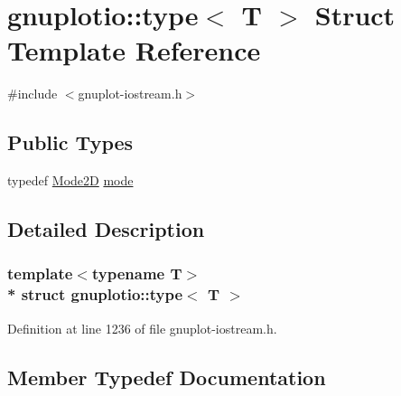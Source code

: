 \hypertarget{structgnuplotio_1_1_mode_auto_decoder_3_01_t_00_01typename_01boost_1_1enable__if__c_3_01_07_arra33ab7f3325313485a7f29355d9a819fc}{}\section{gnuplotio\+:\+:type$<$ T $>$ Struct Template Reference}
\label{structgnuplotio_1_1_mode_auto_decoder_3_01_t_00_01typename_01boost_1_1enable__if__c_3_01_07_arra33ab7f3325313485a7f29355d9a819fc}


{\ttfamily \#include $<$gnuplot-\/iostream.\+h$>$}

\subsection*{Public Types}
\begin{DoxyCompactItemize}
\item 
typedef \hyperlink{structgnuplotio_1_1_mode2_d}{Mode2D} \hyperlink{structgnuplotio_1_1_mode_auto_decoder_3_01_t_00_01typename_01boost_1_1enable__if__c_3_01_07_arra33ab7f3325313485a7f29355d9a819fc_a1574a7286cee13eedaeca8f40e7d0527}{mode}
\end{DoxyCompactItemize}


\subsection{Detailed Description}
\subsubsection*{template$<$typename T$>$\\*
struct gnuplotio\+::type$<$ T $>$}



Definition at line 1236 of file gnuplot-\/iostream.\+h.



\subsection{Member Typedef Documentation}
